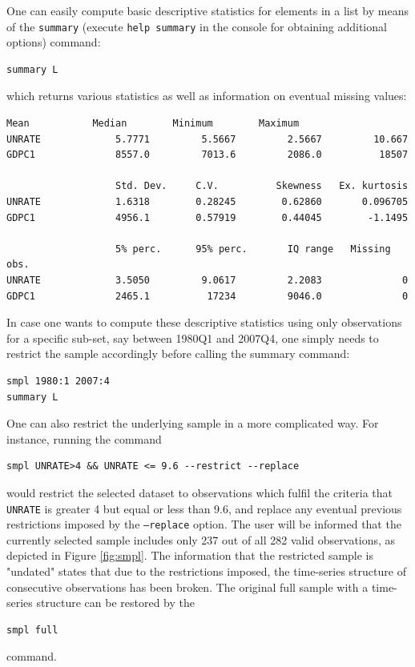 \documentclass[11pt]{article}
\begin{document}
One can easily compute basic descriptive statistics for elements in a list by means of the \texttt{summary} (execute \texttt{help summary} in the console for obtaining additional options) command:
\begin{Verbatim}[baselinestretch=0.75, fontsize=\small]
summary L
\end{Verbatim}
which returns various statistics as well as information on eventual missing values:
\begin{Verbatim}[baselinestretch=0.75, fontsize=\small]
                   Mean           Median        Minimum        Maximum
UNRATE             5.7771         5.5667         2.5667         10.667
GDPC1              8557.0         7013.6         2086.0          18507

                   Std. Dev.     C.V.          Skewness   Ex. kurtosis
UNRATE             1.6318        0.28245        0.62860       0.096705
GDPC1              4956.1        0.57919        0.44045        -1.1495

                   5% perc.      95% perc.       IQ range   Missing obs.
UNRATE             3.5050         9.0617         2.2083              0
GDPC1              2465.1          17234         9046.0              0
\end{Verbatim}

In case one wants to compute these descriptive statistics using only observations for a specific sub-set, say between 1980Q1 and 2007Q4, one simply needs to restrict the sample accordingly before calling the summary command:
\begin{Verbatim}[baselinestretch=0.75, fontsize=\small]
smpl 1980:1 2007:4
summary L
\end{Verbatim}

One can also restrict the underlying sample in a more complicated way. For instance, running the command 
\begin{Verbatim}[baselinestretch=0.75, fontsize=\small]
smpl UNRATE>4 && UNRATE <= 9.6 --restrict --replace
\end{Verbatim}
would restrict the selected dataset to observations which fulfil the criteria that \texttt{UNRATE} is greater 4 but equal or less than 9.6, and replace any eventual previous restrictions imposed by the \texttt{---replace} option. %
The user will be informed that the currently selected sample includes only 237 out of all 282 valid observations, as depicted in Figure \ref{fig:smpl}. The information that the restricted sample is "undated" states that due to the restrictions imposed, the time-series structure of consecutive observations has been broken. The original full sample with a time-series structure can be restored by the
\begin{Verbatim}[baselinestretch=0.75, fontsize=\small]
smpl full
\end{Verbatim}
command.
\end{document}
